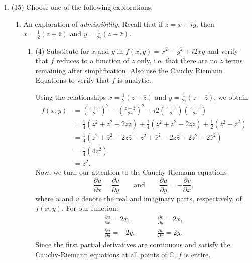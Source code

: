\documentclass[11pt]{article}
\begin{document}
\begin{enumerate}
\begin{mdframed}
\begin{center}
\begin{tikzpicture}[x=(-30:4cm),y=(30:4cm),z=(90:4cm)]
  \end{tikzpicture}
  \end{center}
\end{mdframed}


\item (15) Choose one of the following explorations.
\begin{enumerate}
  \addtocounter{enumii}{1}
  \item  An exploration of {\it admissibility}. Recall that if $z = x + iy$, then $x = \frac{1}{2}(z + \bar{z})$ and $y = \frac{1}{2i}(z - \bar{z})$.
  
  \begin{enumerate}
  \item (4) Substitute for $x$ and $y$ in $f(x,y) = x^2 - y^2 + i2xy$ and verify that $f$ reduces to a function of $z$ only, i.e. that there are no $\bar{z}$ terms remaining after simplification. Also use the Cauchy Riemann Equations to verify that $f$ is analytic.

  \begin{mdframed}
  Using the relationships $x = \frac{1}{2}(z + \bar{z})$ and $y = \frac{1}{2i}(z - \bar{z})$, we obtain
  \begin{align*}
    f(x,y) &= \left(\frac{z + \bar{z}}{2}\right)^2 - \left(\frac{z - \bar{z}}{2i}\right)^2 + i2\left(\frac{z + \bar{z}}{2}\right)\left(\frac{z + \bar{z}}{2i}\right) \\
    &= \frac{1}{4}(z^2 + \bar{z}^2 + 2 z \bar{z}) + \frac{1}{4}(z^2 + \bar{z}^2 - 2 z \bar{z}) + \frac{1}{2}(z^2 - \bar{z}^2) \\
    &= \frac{1}{4}(z^2 + \bar{z}^2 + 2 z \bar{z} + z^2 + \bar{z}^2 - 2 z \bar{z} + 2z^2 - 2\bar{z}^2) \\
    &= \frac{1}{4}(4z^2) \\
    &= z^2.
  \end{align*}
  Now, we turn our attention to the Cauchy-Riemann equations
  \begin{equation*}
    \frac{\partial u}{\partial x} = \frac{\partial v}{\partial y} \qquad\text{and}\qquad \frac{\partial u}{\partial y} = -\frac{\partial v}{\partial x},
  \end{equation*}
  where $u$ and $v$ denote the real and imaginary parts, respectively, of $f(x,y)$. For our function:
  \begin{align*}
    \frac{\partial u}{\partial x} = 2x, \quad&\qquad \frac{\partial v}{\partial y} = 2x, \\
    \frac{\partial u}{\partial y} = -2y, \;&\qquad \frac{\partial v}{\partial x} = 2y.
  \end{align*}
  Since the first partial derivatives are continuous and satisfy the Cauchy-Riemann equations at all points of $\mathbb{C}$, $f$ is entire.
  \end{mdframed}


\end{enumerate}
\end{enumerate}
\end{enumerate}
\end{document}
